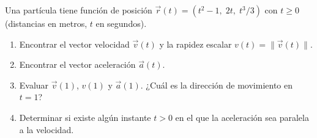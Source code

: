 Una partícula tiene función de posición $\vec{r}(t) = (t^2 - 1,\; 2t,\; t^3/3)$ con $t \geq 0$ (distancias en metros, $t$ en segundos).
\begin{enumerate}
    \item Encontrar el vector velocidad $\vec{v}(t)$ y la rapidez escalar $v(t) = \|\vec{v}(t)\|$.
    \item Encontrar el vector aceleración $\vec{a}(t)$.
    \item Evaluar $\vec{v}(1)$, $v(1)$ y $\vec{a}(1)$. ¿Cuál es la dirección de movimiento en $t=1$?
    \item Determinar si existe algún instante $t > 0$ en el que la aceleración sea paralela a la velocidad.
\end{enumerate}
